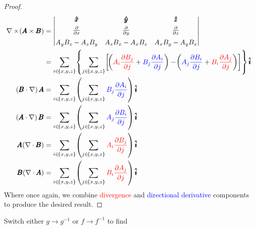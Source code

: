 \documentclass[a4paper]{article}
\begin{document}
\begin{proof}[Proof]
\begin{align*}
	\nabla \times \!\left( \pmb{A} \times \pmb{B} \right) & = \begin{vmatrix}
		\pmb{\hat{x}} & \pmb{\hat{y}} & \pmb{\hat{z}} \\[3pt]
		\frac{\partial }{\partial x} & \frac{\partial }{\partial y} & \frac{\partial }{\partial z} \\[6pt]
		A_{y}B_{z} - A_{z}B_{y} & A_{z}B_{x} - A_{x}B_{z} & A_{x}B_{y} - A_{y}B_{x}
	\end{vmatrix} \\
							      & = \sum_{i \in \!\left\{ x,y,z \right\}}\!\left\{ \sum_{j \in \!\left\{ x,y,z \right\}} \!\left[ \!\left( \textcolor{red}{A_{i}\frac{\partial B_{j}}{\partial j}} + \textcolor{blue}{B_{j}\frac{\partial A_{i}}{\partial j}} \right) - \!\left( \textcolor{blue}{A_{j}\frac{\partial B_{i}}{\partial j}} + \textcolor{red}{B_{i}\frac{\partial A_{j}}{\partial j}} \right) \right]\right\}\pmb{\hat{i}} \\
		\!\left( \pmb{B} \cdot \nabla \right)\pmb{A} & = \sum_{i \in \!\left\{ x,y,z \right\}} \!\left( \sum_{j \in \!\left\{ x,y,z \right\}} \textcolor{blue}{B_{j}\frac{\partial A_{i}}{\partial j}} \right)\pmb{\hat{i}} \\
		\!\left( \pmb{A} \cdot \nabla \right)\pmb{B} & = \sum_{i \in \!\left\{ x,y,z \right\}} \!\left( \sum_{j \in \!\left\{ x,y,z \right\}} \textcolor{blue}{A_{j}\frac{\partial B_{i}}{\partial j}} \right)\pmb{\hat{i}} \\
		\pmb{A}\!\left( \nabla \cdot \pmb{B} \right) & = \sum_{i \in \!\left\{ x,y,z \right\}} \!\left( \sum_{j \in \!\left\{ x,y,z \right\}} \textcolor{red}{A_{i}\frac{\partial B_{j}}{\partial j}} \right)\pmb{\hat{i}} \\
		\pmb{B}\!\left( \nabla \cdot \pmb{A} \right) & = \sum_{i \in \!\left\{ x,y,z \right\}} \!\left( \sum_{j \in \!\left\{ x,y,z \right\}} \textcolor{red}{B_{i}\frac{\partial A_{j}}{\partial j}} \right)\pmb{\hat{i}}
\end{align*}
Where once again, we combine \textcolor{red}{divergence} and \textcolor{blue}{directional derivative} components to produce the desired result.
\end{proof}


Switch either \( g \rightarrow g^{-1} \) or \( f \rightarrow f^{-1} \) to find
\end{document}
